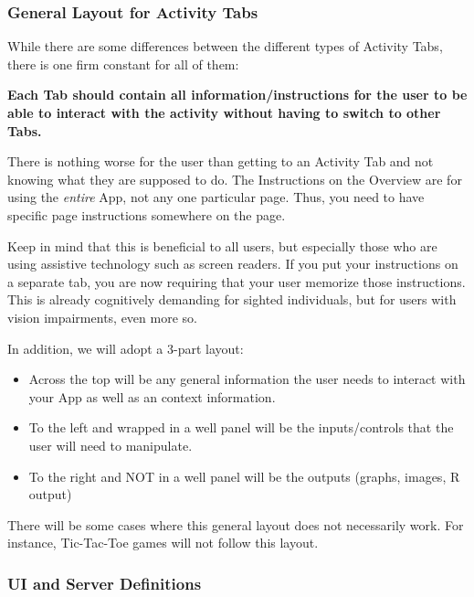 \documentclass[
]{book}
\providecommand{\tightlist}{%
  \setlength{\itemsep}{0pt}\setlength{\parskip}{0pt}}
\begin{document}
\hypertarget{general-layout-for-activity-tabs}{%
\subsubsection{General Layout for Activity Tabs}\label{general-layout-for-activity-tabs}}

While there are some differences between the different types of Activity Tabs, there is one firm constant for all of them:

\textbf{Each Tab should contain all information/instructions for the user to be able to interact with the activity without having to switch to other Tabs.}

There is nothing worse for the user than getting to an Activity Tab and not knowing what they are supposed to do. The Instructions on the Overview are for using the \emph{entire} App, not any one particular page. Thus, you need to have specific page instructions somewhere on the page.

Keep in mind that this is beneficial to all users, but especially those who are using assistive technology such as screen readers. If you put your instructions on a separate tab, you are now requiring that your user memorize those instructions. This is already cognitively demanding for sighted individuals, but for users with vision impairments, even more so.

In addition, we will adopt a 3-part layout:

\begin{itemize}
\tightlist
\item
  Across the top will be any general information the user needs to interact with your App as well as an context information.
\item
  To the left and wrapped in a well panel will be the inputs/controls that the user will need to manipulate.
\item
  To the right and NOT in a well panel will be the outputs (graphs, images, R output)
\end{itemize}

There will be some cases where this general layout does not necessarily work. For instance, Tic-Tac-Toe games will not follow this layout.

\hypertarget{ui-and-server-definitions}{%
\subsubsection{UI and Server Definitions}\label{ui-and-server-definitions}}
\end{document}
